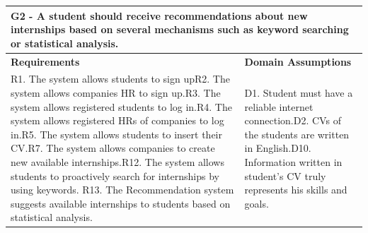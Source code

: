 \documentclass{article}
\begin{document}
\begin{table}[H]
    \centering
    \begin{tabular}{|p{}|p{}|}
        \hline
        \multicolumn{2}{|p{10cm}|}{\textbf{G2} - A student should receive recommendations about new internships based on several mechanisms such as keyword searching or statistical analysis.} \\
        \hline
        \textbf{Requirements} & \textbf{Domain Assumptions} \\
        \hline
          R1. The system allows students to sign up\newline R2. The system allows companies HR to sign up.\newline R3. The system allows registered students to log in.\newline R4. The system allows registered HRs of companies to log in.\newline R5. The system allows students to insert their CV.\newline R7. The system allows companies to create new available internships.\newline R12. The system allows students to proactively search for internships by
using keywords. \newline R13. The Recommendation system suggests available internships to students
based on statistical analysis.\newline & D1. Student must have a reliable internet connection.\newline D2. CVs of the students are written in English.\newline D10. Information written in student’s CV truly represents his skills and goals. \newline
\\
        \hline
    \end{tabular}
\end{table}
\end{document}
